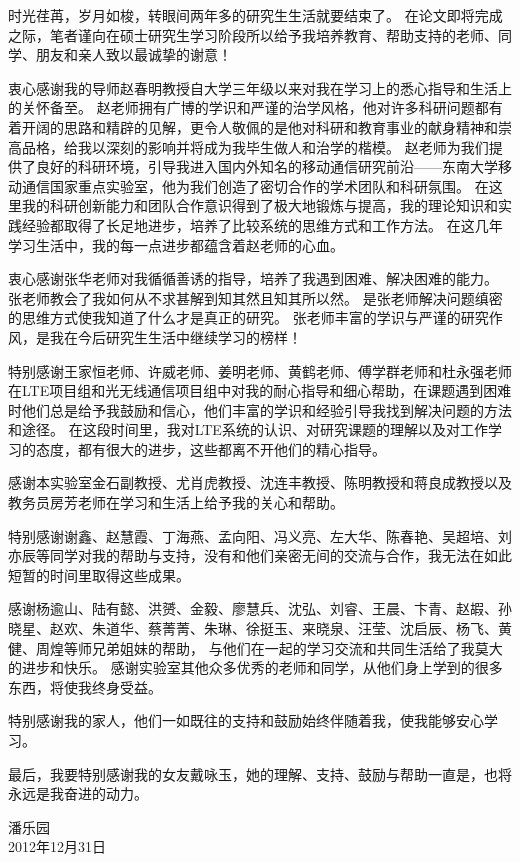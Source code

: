 
\begin{Acknowledgement}
时光荏苒，岁月如梭，转眼间两年多的研究生生活就要结束了。
在论文即将完成之际，笔者谨向在硕士研究生学习阶段所以给予我培养教育、帮助支持的老师、同学、朋友和亲人致以最诚挚的谢意！

衷心感谢我的导师赵春明教授自大学三年级以来对我在学习上的悉心指导和生活上的关怀备至。
赵老师拥有广博的学识和严谨的治学风格，他对许多科研问题都有着开阔的思路和精辟的见解，更令人敬佩的是他对科研和教育事业的献身精神和崇高品格，给我以深刻的影响并将成为我毕生做人和治学的楷模。
赵老师为我们提供了良好的科研环境，引导我进入国内外知名的移动通信研究前沿——东南大学移动通信国家重点实验室，他为我们创造了密切合作的学术团队和科研氛围。
在这里我的科研创新能力和团队合作意识得到了极大地锻炼与提高，我的理论知识和实践经验都取得了长足地进步，培养了比较系统的思维方式和工作方法。
在这几年学习生活中，我的每一点进步都蕴含着赵老师的心血。

衷心感谢张华老师对我循循善诱的指导，培养了我遇到困难、解决困难的能力。
张老师教会了我如何从不求甚解到知其然且知其所以然。
是张老师解决问题缜密的思维方式使我知道了什么才是真正的研究。
张老师丰富的学识与严谨的研究作风，是我在今后研究生生活中继续学习的榜样！

特别感谢王家恒老师、许威老师、姜明老师、黄鹤老师、傅学群老师和杜永强老师在LTE项目组和光无线通信项目组中对我的耐心指导和细心帮助，在课题遇到困难时他们总是给予我鼓励和信心，他们丰富的学识和经验引导我找到解决问题的方法和途径。
在这段时间里，我对LTE系统的认识、对研究课题的理解以及对工作学习的态度，都有很大的进步，这些都离不开他们的精心指导。

感谢本实验室金石副教授、尤肖虎教授、沈连丰教授、陈明教授和蒋良成教授以及教务员房芳老师在学习和生活上给予我的关心和帮助。

特别感谢谢鑫、赵慧霞、丁海燕、孟向阳、冯义亮、左大华、陈春艳、吴超培、刘亦辰等同学对我的帮助与支持，没有和他们亲密无间的交流与合作，我无法在如此短暂的时间里取得这些成果。

感谢杨逾山、陆有懿、洪赟、金毅、廖慧兵、沈弘、刘睿、王晨、卞青、赵嘏、孙晓星、赵欢、朱道华、蔡菁菁、朱琳、徐挺玉、来晓泉、汪莹、沈启辰、杨飞、黄健、周煌等师兄弟姐妹的帮助，
与他们在一起的学习交流和共同生活给了我莫大的进步和快乐。
感谢实验室其他众多优秀的老师和同学，从他们身上学到的很多东西，将使我终身受益。

特别感谢我的家人，他们一如既往的支持和鼓励始终伴随着我，使我能够安心学习。

最后，我要特别感谢我的女友戴咏玉，她的理解、支持、鼓励与帮助一直是，也将永远是我奋进的动力。

\begin{flushright}
潘乐园 \\
2012年12月31日\\
\end{flushright}

\end{Acknowledgement} 